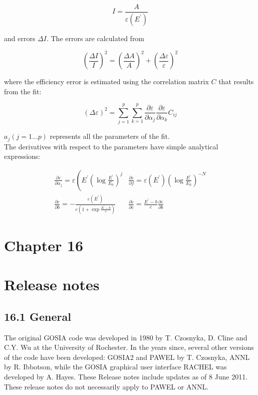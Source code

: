 \documentclass[10pt]{article}
\begin{document}
$$
I=\frac{A}{\varepsilon\left(E^{\prime}\right)}
$$

and errors $\Delta I$. The errors are calculated from

$$
\left(\frac{\Delta I}{I}\right)^{2}=\left(\frac{\Delta A}{A}\right)^{2}+\left(\frac{\Delta \varepsilon}{\varepsilon}\right)^{2}
$$

where the efficiency error is estimated using the correlation matrix $C$ that results from the fit:

$$
(\Delta \varepsilon)^{2}=\sum_{j=1}^{p} \sum_{k=1}^{p} \frac{\partial \varepsilon}{\partial \alpha_{j}} \frac{\partial \varepsilon}{\partial \alpha_{k}} C_{i j}
$$

$a_{j}(j=1 \ldots p)$ represents all the parameters of the fit.\\
The derivatives with respect to the parameters have simple analytical expressions:

$$
\begin{array}{cc}
\frac{\partial \varepsilon}{\partial \alpha_{j}}=\varepsilon\left(E^{\prime}\left(\log \frac{E^{\prime}}{E_{0}}\right)^{j}\right. & \frac{\partial \varepsilon}{\partial f}=\varepsilon\left(E^{\prime}\right)\left(\log \frac{E^{\prime}}{E_{0}}\right)^{-N} \\
\frac{\partial \varepsilon}{\partial b}=-\frac{\varepsilon\left(E^{\prime}\right)}{c\left(1+\exp \frac{E^{\prime}-b}{c}\right)} & \frac{\partial \varepsilon}{\partial c}=\frac{E^{\prime}-b}{c} \frac{\partial \varepsilon}{\partial b}
\end{array}
$$

\section*{Chapter 16}
\section*{Release notes}


\subsection*{16.1 General}
The original GOSIA code was developed in 1980 by T. Czosnyka, D. Cline and C.Y. Wu at the University of Rochester. In the years since, several other versions of the code have been developed: GOSIA2 and PAWEL by T. Czosnyka, ANNL by R. Ibbotson, while the GOSIA graphical user interface RACHEL was developed by A. Hayes. These Release notes include updates as of 8 June 2011. These release notes do not necessarily apply to PAWEL or ANNL.
\end{document}
